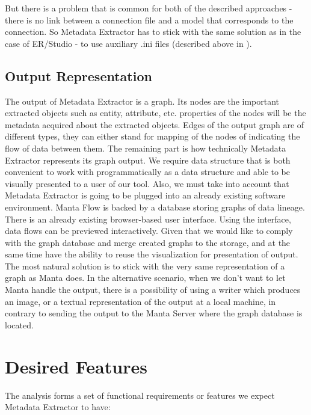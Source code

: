 But there is a problem that is common for both of the described approaches -  there is no link between a connection file and a model that corresponds to the connection. 
So Metadata Extractor has to stick with the same solution as in the case of ER/Studio - to use auxiliary .ini files (described above in ).

\subsection{Output Representation}

The output of Metadata Extractor is a graph. Its nodes are the important extracted objects such as entity, attribute, etc. properties of the nodes will be the metadata acquired about the extracted objects. Edges of the output graph are of different types, they can either stand for mapping of the nodes of indicating the flow of data between them. 
The remaining part is how technically Metadata Extractor represents its graph output. We require data structure that is both convenient to work with programmatically as a data structure and able to be visually presented to a user of our tool.
Also, we must take into account that Metadata Extractor is going to be plugged into an already existing software environment. 
Manta Flow is backed by a database storing graphs of data lineage. There is an already existing browser-based user interface. Using the interface, data flows can be previewed interactively. 
Given that we would like to comply with the graph database and merge created graphs to the storage, and at the same time have the ability to reuse the visualization for presentation of output. The most natural solution is to stick with the very same representation of a graph as Manta does.
In the alternative scenario, when we don't want to let Manta handle the output, there is a possibility of using a writer which produces an image, or a textual representation of the output at a local machine, in contrary to sending the output to the Manta Server where the graph database is located.

\section{Desired Features}

The analysis forms a set of functional requirements or features we expect Metadata Extractor to have:

